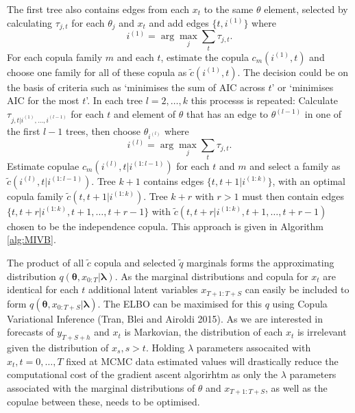\documentclass[12pt,a4paper]{article}%
\numberwithin{equation}{section}
\begin{document}
The first tree also contains edges from each $x_t$ to the same $\theta$ element, selected by calculating $\tau_{j, t}$ for each $\theta_j$ and $x_t$ and add edges $\{t, i^{(1)} \}$ where
\begin{equation}
\label{Vine:TauCrit}
i^{(1)} = \arg \underset{j}{\max} \sum_{t} \tau_{j, t}.
\end{equation}
For each copula family $m$ and each $t$, estimate the copula $c_m(i^{(1)}, t)$ and choose one family for all of these copula as $\tilde{c}(i^{(1)}, t)$. The decision could be on the basis of criteria such as `minimises the sum of AIC across $t$' or `minimises AIC for the most $t$'. In each tree $l = 2, \dots, k$ this processs is repeated: Calculate $\tau_{j, t | i^{(1)}, \dots, i^{(l-1)}}$ for each $t$ and element of $\theta$ that has an edge to $\theta^{(l-1)}$ in one of the first $l-1$ trees, then choose $\theta_{i^{(l)}}$ where
\begin{equation}
\label{Vine:TauCrit}
i^{(l)} = \arg \underset{j}{\max} \sum_{t} \tau_{j, t}.
\end{equation}
Estimate copulae $c_m(i^{(l)}, t | i^{(1:l-1)})$ for each $t$ and $m$ and select a family as $\tilde{c}(i^{(l)}, t |i^{(1:l-1)})$. Tree $k+1$ contains edges $\{t, t+1 |  i^{(1:k)} \}$, with an optimal copula family $\tilde{c}(t, t+1 |i^{(1:k)})$. Tree $k+r$ with $r > 1$ must then contain edges $\{t, t+r |  i^{(1:k)}, t+1, \dots, t+r-1 \}$ with $\tilde{c}(t, t+r |  i^{(1:k)}, t+1, \dots, t+r-1)$ chosen to be the independence copula. This approach is given in Algorithm \ref{alg:MIVB}.

The product of all $\tilde{c}$ copula and selected $\tilde{q}$ marginals forms the approximating distribution $q(\boldsymbol{\theta}, x_{0:T} | \boldsymbol{\lambda})$. As the marginal distributions and copula for $x_t$ are identical for each $t$ additional latent variables $x_{T+1:T+S}$ can easily be included to form $q(\boldsymbol{\theta}, x_{0:T+S} | \boldsymbol{\lambda})$. The ELBO can be maximised for this $q$ using Copula Variational Inference (Tran, Blei and Airoldi 2015). As we are interested in forecasts of $y_{T+S+h}$ and $x_t$ is Markovian, the distribution of each $x_t$ is irrelevant given the distribution of $x_s, s > t$. Holding $\lambda$ parameters assocaited with $x_t, t = 0, \dots, T$ fixed at MCMC data estimated values will drastically reduce the computational cost of the gradient ascent algorirhtm as only the $\lambda$ parameters associated with the marginal distributions of $\theta$ and $x_{T+1:T+S}$, as well as the copulae between these, needs to be optimised.
\end{document}
